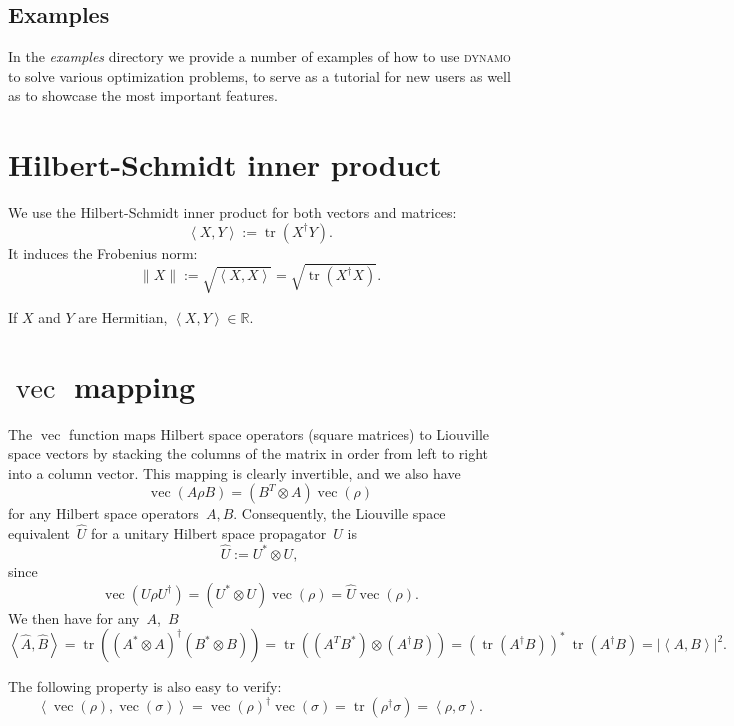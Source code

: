 \documentclass[aps, pra, a4paper, longbibliography, superscriptaddress]{revtex4-1}
\newcommand{\be}{\begin{equation}}
\newcommand{\ee}{\end{equation}}
\newcommand{\R}{{\mathbb R}}  %
\newcommand{\inprod}[2]{\left\langle #1, #2 \right\rangle}
\DeclareMathOperator{\tr}{tr}
\DeclareMathOperator{\cvec}{vec}
\newcommand{\vecop}[1]{\widehat{#1}}
\newcommand{\DYNAMO}{\textsc{dynamo}}
\begin{document}
\subsection{Examples}
In the \emph{examples} directory we provide a number of examples of
how to use \DYNAMO{} to solve various optimization problems, to
serve as a tutorial for new users as well as to showcase the most important features.



\appendix
\section{Hilbert-Schmidt inner product}
\label{sec:hs}

We use the Hilbert-Schmidt inner product for both vectors and matrices:
\be
\inprod{X}{Y} := \tr\left(X^\dagger Y\right).
\ee
It induces the Frobenius norm:
\be
\|X\| := \sqrt{\inprod{X}{X}} = \sqrt{\tr\left(X^\dagger X\right)}.
\ee

If $X$ and $Y$ are Hermitian, $\inprod{X}{Y} \in \R$.

\section{$\cvec$ mapping}
\label{sec:vec}

The $\cvec$ function maps Hilbert space operators (square matrices) to
Liouville space vectors by stacking the columns of the matrix in order
from left to right into a column vector. This mapping is clearly
invertible, and we also have
\be
\cvec(A \rho B) = (B^T \otimes A) \cvec(\rho)
\ee
for any Hilbert space operators~$A, B$.
Consequently, the Liouville space equivalent~$\vecop{U}$ for a unitary Hilbert space
propagator~$U$ is
\be
\label{eq:L-unitary}
\vecop{U} := U^* \otimes U,
\ee
since
\be
\cvec(U \rho U^\dagger) = (U^* \otimes U) \cvec(\rho) = \vecop{U} \cvec(\rho).
\ee
We then have for any~$A$,~$B$
\be
\label{eq:hat-product}
\inprod{\vecop{A}}{\vecop{B}}
= \tr((A^* \otimes A)^\dagger (B^* \otimes B))
= \tr((A^T B^*) \otimes (A^\dagger B))
= (\tr(A^\dagger B))^* \: \tr(A^\dagger B)
= |\inprod{A}{B}|^2.
\ee

The following property is also easy to verify:
\be
\label{eq:vec-isometry}
\inprod{\cvec(\rho)}{\cvec(\sigma)} = \cvec(\rho)^\dagger \cvec(\sigma)
= \tr(\rho^\dagger \sigma) = \inprod{\rho}{\sigma}.
\ee






\end{document}
